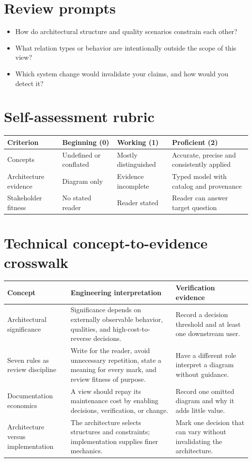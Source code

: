\documentclass[10pt,letterpaper]{article}
\begin{document}
\section{Review prompts}
\begin{itemize}
\item How do architectural structure and quality scenarios constrain each other?
\item What relation types or behavior are intentionally outside the scope of this view?
\item Which system change would invalidate your claims, and how would you detect it?
\end{itemize}
\section{Self-assessment rubric}
\small
\begin{tabularx}{\linewidth}{@{}YYYY@{}}
\toprule
\textbf{Criterion} & \textbf{Beginning (0)} & \textbf{Working (1)} & \textbf{Proficient (2)} \\
\midrule
Concepts & Undefined or conflated & Mostly distinguished & Accurate, precise and consistently applied \\
Architecture evidence & Diagram only & Evidence incomplete & Typed model with catalog and provenance \\
Stakeholder fitness & No stated reader & Reader stated & Reader can answer target question \\
\bottomrule
\end{tabularx}
\normalsize
\section{Technical concept-to-evidence crosswalk}
\small
\begin{tabularx}{\linewidth}{@{}YYY@{}}
\toprule
\textbf{Concept} & \textbf{Engineering interpretation} & \textbf{Verification evidence} \\
\midrule
Architectural significance & Significance depends on externally observable behavior, qualities, and high-cost-to-reverse decisions. & Record a decision threshold and at least one downstream user. \\
Seven rules as review discipline & Write for the reader, avoid unnecessary repetition, state a meaning for every mark, and review fitness of purpose. & Have a different role interpret a diagram without guidance. \\
Documentation economics & A view should repay its maintenance cost by enabling decisions, verification, or change. & Record one omitted diagram and why it adds little value. \\
Architecture versus implementation & The architecture selects structures and constraints; implementation supplies finer mechanics. & Mark one decision that can vary without invalidating the architecture. \\
\bottomrule
\end{tabularx}
\normalsize
\end{document}
